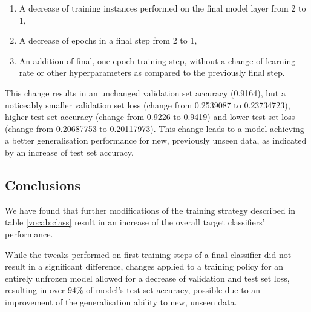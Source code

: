 \begin{enumerate}
    \item A decrease of training instances performed on the final model layer from 2 to 1,
    \item A decrease of epochs in a final step from 2 to 1,
    \item An addition of final, one-epoch training step, without a change of learning rate or other hyperparameters as compared to the previously final step.
\end{enumerate}

This change results in an unchanged validation set accuracy (0.9164), but a noticeably smaller validation set loss (change from 0.2539087 to 0.23734723), higher test set accuracy (change from 0.9226 to 0.9419) and lower test set loss (change from 0.20687753 to 0.20117973). This change leads to a model achieving a better generalisation performance for new, previously unseen data, as indicated by an increase of test set accuracy.

\subsection{Conclusions}

We have found that further modifications of the training strategy described in table \ref{vocab:class} result in an increase of the overall target classifiers' performance.

While the tweaks performed on first training steps of a final classifier did not result in a significant difference, changes applied to a training policy for an entirely unfrozen model allowed for a decrease of validation and test set loss, resulting in over 94\% of model's test set accuracy, possible due to an improvement of the generalisation ability to new, unseen data.

